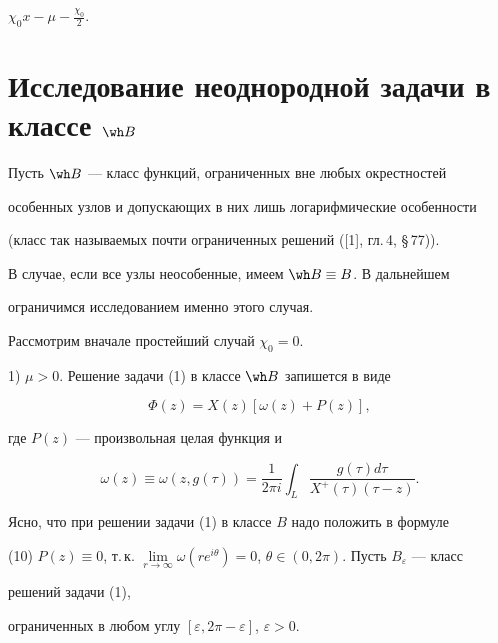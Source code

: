 $\chi_0x-\mu-\frac{\chi_0}{2}$. 


 


 


\section{Исследование неоднородной задачи в классе $\wh B$} 


 


Пусть $\wh B$ --- класс функций, ограниченных вне любых окрестностей 


особенных узлов и допускающих в них лишь логарифмические особенности 


(класс так называемых почти ограниченных решений ([1], гл.\,4, \S\,77)). 


В случае, если все узлы неособенные, имеем $\wh B\equiv B$. В дальнейшем 


ограничимся исследованием именно этого случая. 


 


Рассмотрим вначале простейший случай $\chi_0=0$. 


 


1) $\mu>0$. Решение задачи (1) в классе $\wh B$ запишется в виде 


\begin{equation} 


\Phi(z)=X(z)[\omega(z)+P(z)], 


\end{equation} 


где $P(z)$ --- произвольная целая функция и 


\begin{equation} 


\omega(z)\equiv\omega(z,g(\tau))=\frac{1}{2\pi i} 


\int_L\frac{g(\tau)d\tau}{X^+(\tau)(\tau-z)}. 


\end{equation} 


Ясно, что при решении задачи (1) в классе $B$ надо положить в формуле 


(10) $P(z)\equiv0$, т.\,к. $\lim\limits_{r\to\infty}\omega 


(re^{i\theta})=0$, $\theta\in(0,2\pi)$. Пусть $B_\varepsilon$ --- класс 


решений задачи (1), 


ограниченных в любом углу $[\varepsilon,2\pi-\varepsilon]$, $\varepsilon>0$. 


